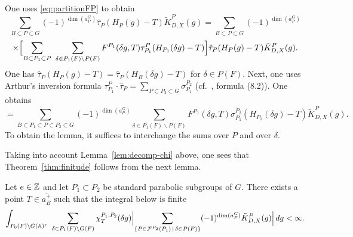 \begin{paragr}
\begin{preuve}
One uses \eqref{eq:partitionFP} to obtain
$$\sum_{B\subset P\subset G} (-1)^{\dim(a_P^G)}\hat{\tau}_P(H_P(g)-T)\tilde{K}^P_{D,X}(g)=\sum_{B\subset P\subset G} (-1)^{\dim(a_P^G)}$$
$$\times \Bigl[\sum_{B\subset P_1\subset P}\ \sum_{\delta\in P_1(F)\backslash P(F)} F^{P_1}(\delta g,T)\tau_{P_1}^P(H_{P_1}(\delta g)-T)\Bigr]\hat{\tau}_P(H_P(g)-T)\tilde{K}^P_{D,X}(g).$$
One has $\hat{\tau}_P(H_P(g)-T)=\hat{\tau}_P(H_B(\delta g)-T)$ for $\delta\in P(F)$. Next, one uses Arthur's inversion formula $\tau_{P_1}^P\cdot \hat{\tau}_P=\sum_{P\subset P_2\subset G}\sigma_{P_1}^{P_2}$ (cf.\ \cite{ar-intro}, formula (8.2)). One obtains
$$=\sum_{B\subset P_1\subset P\subset P_2\subset G} (-1)^{\dim(a_P^G)}\sum_{\delta\in P_1(F)\backslash P(F)} F^{P_1}(\delta g,T)\sigma_{P_1}^{P_2}(H_{P_1}(\delta g)-T)\tilde{K}^P_{D,X}(g).$$
To obtain the lemma, it suffices to interchange the sums over $P$ and over $\delta$.
\end{preuve}

Taking into account Lemma~\ref{lem:decomp-chi} above, one sees that Theorem~\ref{thm:finitude} follows from the next lemma.

\begin{lemme}\label{lem:finitude-P1P2}
Let $e\in \mathbb{Z}$ and let $P_1\subset P_2$ be standard parabolic subgroups of $G$. There exists a point $T\in \overline{a_B^+}$ such that the integral below is finite
\begin{equation}
  \label{eq:intP1P2}
  \int_{P_0(F)\backslash G(\mathbb{A})^e}\ \sum_{\delta\in P_1(F)\backslash G(F)} \chi_T^{P_1,P_2}(\delta g)\Bigl|\sum_{\{P\in \mathcal{F}^{P_2}(P_1)\,|\,\delta\in P(F)\}} (-1)^{\dim(a_P^G)}\tilde{K}^P_{D,X}(g)\Bigr|\, dg<\infty.
\end{equation}
\end{lemme}


\end{paragr}
